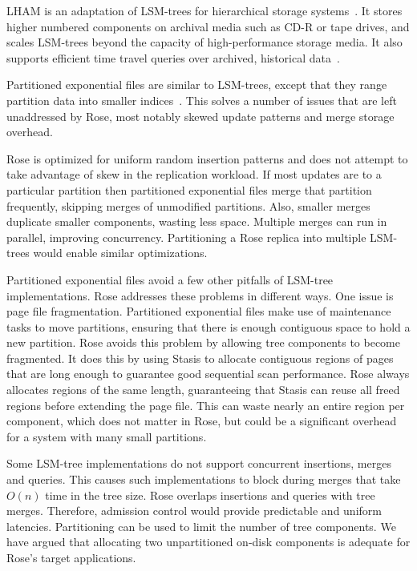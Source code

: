 \documentclass{vldb}
\newcommand{\rows}{Rose\xspace}
\newcommand{\rowss}{Rose's\xspace}
\begin{document}
LHAM is an adaptation of LSM-trees for hierarchical storage
systems~\cite{lham}.  It stores higher numbered
components on archival media such as CD-R or tape drives, and
scales LSM-trees beyond the capacity of high-performance storage
media.  It also supports efficient time travel queries over archived, historical
data~\cite{lham}.

Partitioned exponential files are similar to LSM-trees, except that
they range partition data into smaller indices~\cite{partexp}.  This solves a number
of issues that are left unaddressed by \rows, most notably
skewed update patterns and merge storage
overhead.

\rows is optimized for uniform random insertion patterns
and does not attempt to take advantage of skew in the replication
workload.  If most updates are to a particular partition then
partitioned exponential files merge that partition frequently,
skipping merges of unmodified partitions.
Also, smaller merges duplicate smaller components, wasting less space.
Multiple merges can run in parallel, improving concurrency.
Partitioning a \rows
replica into multiple LSM-trees would enable similar optimizations.

Partitioned exponential files avoid a few other pitfalls of LSM-tree
implementations.  \rows addresses these problems in different ways.
One issue is page file fragmentation.  Partitioned exponential files
make use of maintenance tasks to move partitions, ensuring that there
is enough contiguous space to hold a new partition.  \rows avoids this
problem by allowing tree components to become fragmented.  It does
this by using Stasis to allocate contiguous regions of pages that
are long enough to guarantee good sequential scan performance.
\rows always allocates regions of the same length, guaranteeing that
Stasis can reuse all freed regions before extending the page file.
This can waste nearly an entire region per component, which does not
matter in \rows, but could be a significant overhead for a system with
many small partitions.

Some LSM-tree implementations do not support concurrent insertions,
merges and queries.  This causes such implementations to block during
merges that take $O(n)$ time in the tree size.
\rows overlaps insertions and queries with tree merges.  Therefore,
admission control would provide predictable and uniform latencies.
Partitioning can be used to limit the number of tree components.  We
have argued that allocating two unpartitioned on-disk components is adequate for
\rowss target applications.
\end{document}
